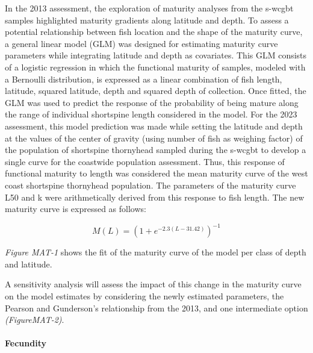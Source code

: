 \documentclass[11pt,
  english,
  letterpaper,
]{article}
\begin{document}
In the 2013 assessment, the exploration of maturity analyses from the \gls{s-wcgbt} samples highlighted maturity gradients along latitude and depth. To assess a potential relationship between fish location and the shape of the maturity curve, a general linear model (GLM) was designed for estimating maturity curve parameters while integrating latitude and depth as covariates. This GLM consists of a logistic regression in which the functional maturity of samples, modeled with a Bernoulli distribution, is expressed as a linear combination of fish length, latitude, squared latitude, depth and squared depth of collection. Once fitted, the GLM was used to predict the response of the probability of being mature along the range of individual shortspine length considered in the model. For the 2023 assessment, this model prediction was made while setting the latitude and depth at the values of the center of gravity (using number of fish as weighing factor) of the population of shortspine thornyhead sampled during the \gls{s-wcgbt} to develop a single curve for the coastwide population assessment. Thus, this response of functional maturity to length was considered the mean maturity curve of the west coast shortspine thornyhead population. The parameters of the maturity curve L50 and k were arithmetically derived from this response to fish length. The new maturity curve is expressed as follows:

\begin{equation} M(L) = (1+e^{-2.3(L-31.42)})^{-1}\end{equation}

\emph{\emph{Figure MAT-1}} shows the fit of the maturity curve of the model per class of depth and latitude.

A sensitivity analysis will assess the impact of this change in the maturity curve on the model estimates by considering the newly estimated parameters, the Pearson and Gunderson's relationship from the 2013, and one intermediate option \emph{\emph{(FigureMAT-2)}}.

\hypertarget{fecundity}{%
\paragraph{Fecundity}\label{fecundity}}
\end{document}
